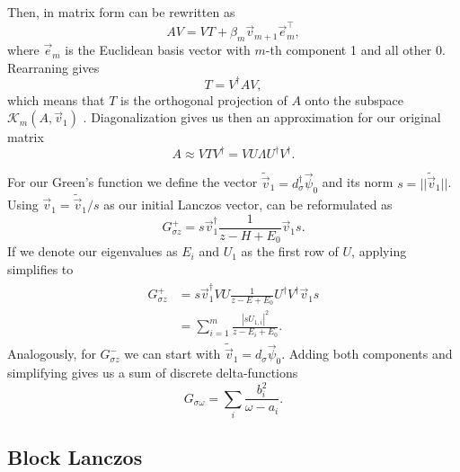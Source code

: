 Then,  in matrix form can be rewritten as
\begin{equation}
    A V = V T + \beta_{m}\vec{v}_{m+1}\vec{e}_{m}^\intercal,
\end{equation}
where $\vec{e}_m$ is the Euclidean basis vector with $m$-th component 1 and all other 0.
Rearraning gives
\begin{equation}
    T = V^\dag A V,
\end{equation}
which means that $T$ is the orthogonal projection of $A$ onto
the subspace $\mathcal{K}_m(A, \vec{v}_1)$ \cite{Cullum1985}.
Diagonalization gives us then an approximation for our original matrix
\begin{equation}
    A \approx V T V^\dag = V U \Lambda U^\dag V^\dag.
    \label{eq:Lanczos-matrix-approximation}
\end{equation}

For our Green's function we define the vector $\tilde{\vec{v}}_1 = d_\sigma^\dag \vec{\psi}_0$
and its norm $s = ||\tilde{\vec{v}}_1||$.
Using $\vec{v}_1 = \tilde{\vec{v}}_1/s$ as our initial Lanczos vector,
 can be reformulated as
\begin{equation}
    G^+_{\sigma z} = s \vec{v}_1^\dag \frac{1}{z - H + E_0} \vec{v}_1 s.
\end{equation}
If we denote our eigenvalues as $E_i$ and $U_1$ as the first row of $U$,
applying  simplifies to
\begin{align}
    \begin{split}
        G^+_{\sigma z}
         & =
        s \vec{v}_1^\dag V U \frac{1}{z - E + E_0} U^\dag V^\dag \vec{v}_1 s \\
         & =
        \sum_{i=1}^m \frac{|s U_{1,i}|^2}{z - E_i + E_0}.
    \end{split}
\end{align}
Analogously, for $G^-_{\sigma z}$ we can start with $\tilde{\vec{v}}_1 = d_\sigma \vec{\psi}_0$.
Adding both components and simplifying gives us a sum of discrete delta-functions \cite{Lu2014}
\begin{equation}
    G_{\sigma\omega} = \sum_i \frac{b_i^2}{\omega - a_i}.
\end{equation}

\subsection{Block Lanczos}

